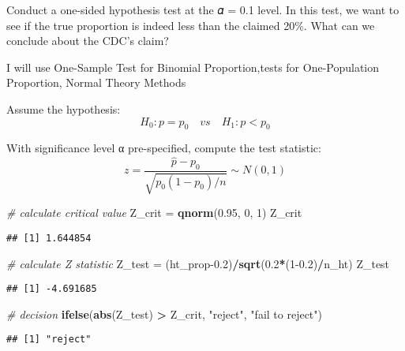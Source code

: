 \documentclass[
]{article}
\newenvironment{Shaded}{\begin{snugshade}}{\end{snugshade}}
\newcommand{\CommentTok}[1]{\textcolor[rgb]{0.56,0.35,0.01}{\textit{#1}}}
\newcommand{\DecValTok}[1]{\textcolor[rgb]{0.00,0.00,0.81}{#1}}
\newcommand{\FloatTok}[1]{\textcolor[rgb]{0.00,0.00,0.81}{#1}}
\newcommand{\FunctionTok}[1]{\textcolor[rgb]{0.13,0.29,0.53}{\textbf{#1}}}
\newcommand{\NormalTok}[1]{#1}
\newcommand{\OtherTok}[1]{\textcolor[rgb]{0.56,0.35,0.01}{#1}}
\newcommand{\SpecialCharTok}[1]{\textcolor[rgb]{0.81,0.36,0.00}{\textbf{#1}}}
\newcommand{\StringTok}[1]{\textcolor[rgb]{0.31,0.60,0.02}{#1}}
\begin{document}
Conduct a one-sided hypothesis test at the 𝛼 = 0.1 level. In this test,
we want to see if the true proportion is indeed less than the claimed
20\%. What can we conclude about the CDC's claim?

I will use One-Sample Test for Binomial Proportion,tests for
One-Population Proportion, Normal Theory Methods

Assume the hypothesis: \[H_0 : p = p_0 \quad vs \quad H_1 : p < p_0\]

With significance level α pre-specified, compute the test statistic:
\[ z = {\frac{\hat{p} - p_0}{\sqrt{p_0(1 - p_0)/n}}}\sim N(0,1)\]

\begin{Shaded}
\begin{Highlighting}[]
\CommentTok{\# calculate critical value  }
\NormalTok{Z\_crit }\OtherTok{=} \FunctionTok{qnorm}\NormalTok{(}\FloatTok{0.95}\NormalTok{, }\DecValTok{0}\NormalTok{, }\DecValTok{1}\NormalTok{)}
\NormalTok{Z\_crit}
\end{Highlighting}
\end{Shaded}

\begin{verbatim}
## [1] 1.644854
\end{verbatim}

\begin{Shaded}
\begin{Highlighting}[]
\CommentTok{\# calculate Z statistic}
\NormalTok{Z\_test }\OtherTok{=}\NormalTok{ (ht\_prop}\FloatTok{{-}0.2}\NormalTok{)}\SpecialCharTok{/}\FunctionTok{sqrt}\NormalTok{(}\FloatTok{0.2}\SpecialCharTok{*}\NormalTok{(}\DecValTok{1}\FloatTok{{-}0.2}\NormalTok{)}\SpecialCharTok{/}\NormalTok{n\_ht)}
\NormalTok{Z\_test}
\end{Highlighting}
\end{Shaded}

\begin{verbatim}
## [1] -4.691685
\end{verbatim}

\begin{Shaded}
\begin{Highlighting}[]
\CommentTok{\# decision}
\FunctionTok{ifelse}\NormalTok{(}\FunctionTok{abs}\NormalTok{(Z\_test) }\SpecialCharTok{\textgreater{}}\NormalTok{ Z\_crit, }\StringTok{"reject"}\NormalTok{, }\StringTok{"fail to reject"}\NormalTok{)}
\end{Highlighting}
\end{Shaded}

\begin{verbatim}
## [1] "reject"
\end{verbatim}
\end{document}

